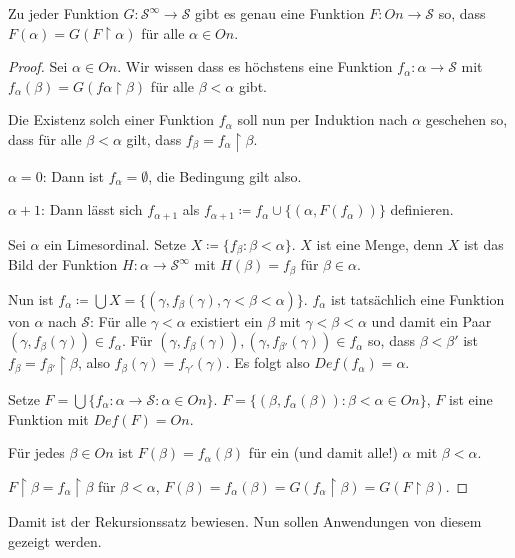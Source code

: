 \begin{satz}[Rekursionssatz]
	Zu jeder Funktion $G:\mathcal{S}^\infty\to\mathcal{S}$ gibt es genau eine Funktion $F:On\to\mathcal{S}$ so, dass $F(\alpha)=G(F\upharpoonright\alpha)$ für alle $\alpha\in On$.
\end{satz}
\begin{proof}
	Sei $\alpha\in On$. Wir wissen dass es höchstens eine Funktion $f_\alpha:\alpha\to\mathcal{S}$ mit $f_\alpha(\beta)=G(f\alpha\upharpoonright\beta)$ für alle $\beta<\alpha$ gibt.
	
	Die Existenz solch einer Funktion $f_\alpha$ soll nun per Induktion nach $\alpha$ geschehen so, dass für alle $\beta<\alpha$ gilt, dass $f_\beta=f_\alpha\upharpoonright\beta$.
	
	$\alpha=0$: Dann ist $f_\alpha=\emptyset$, die Bedingung gilt also.
	
	$\alpha+1$: Dann lässt sich $f_{\alpha+1}$ als $f_{\alpha+1}\coloneqq f_\alpha\cup\{(\alpha, F(f_\alpha))\}$ definieren.
	
	Sei $\alpha$ ein Limesordinal. Setze $X\coloneqq\{f_\beta : \beta < \alpha\}$. $X$ ist eine Menge, denn $X$ ist das Bild der Funktion $H:\alpha\to\mathcal{S}^\infty$ mit $H(\beta)=f_\beta$ für $\beta\in\alpha$.
	
	Nun ist $f_\alpha\coloneqq\bigcup X=\{(\gamma,f_\beta(\gamma), \gamma<\beta<\alpha)\}$. $f_\alpha$ ist tatsächlich eine Funktion von $\alpha$ nach $\mathcal{S}$: Für alle $\gamma<\alpha$ existiert ein $\beta$ mit $\gamma<\beta<\alpha$ und damit ein Paar $(\gamma,f_\beta(\gamma))\in f_\alpha$. Für $(\gamma,f_\beta(\gamma)),(\gamma,f_{\beta'}(\gamma))\in f_\alpha$ so, dass $\beta<\beta'$ ist $f_\beta=f_{\beta'}\upharpoonright \beta$, also $f_\beta(\gamma)=f_{\gamma'}(\gamma)$. Es folgt also $Def(f_\alpha)=\alpha$.
	
	Setze $F=\bigcup\{f_\alpha:\alpha\to\mathcal{S} : \alpha\in On\}$. $F=\{(\beta, f_\alpha(\beta)):\beta<\alpha\in On\}$, $F$ ist eine Funktion mit $Def(F)=On$.
	
	Für jedes $\beta\in On$ ist $F(\beta)=f_\alpha(\beta)$ für ein (und damit alle!) $\alpha$ mit $\beta<\alpha$.
	
	$F\upharpoonright\beta=f_\alpha\upharpoonright\beta$ für $\beta<\alpha$, $F(\beta)=f_\alpha(\beta)=G(f_\alpha\upharpoonright\beta)=G(F\upharpoonright\beta)$.
\end{proof}

Damit ist der Rekursionssatz bewiesen. Nun sollen Anwendungen von diesem gezeigt werden.\\

